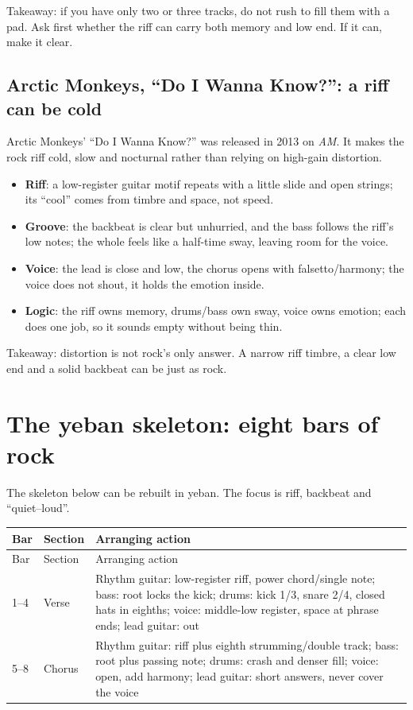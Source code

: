 Takeaway: if you have only two or three tracks, do not rush to fill them with a pad. Ask first whether the riff can carry both memory and low end. If it can, make it clear.

\subsection{Arctic Monkeys, ``Do I Wanna Know?'': a riff can be cold}
\label{sec:rock-case-do-i-wanna-know}

Arctic Monkeys' ``Do I Wanna Know?'' was released in 2013 on \emph{AM}. It makes the rock riff cold, slow and nocturnal rather than relying on high-gain distortion.

\begin{itemize}
\item \textbf{Riff}: a low-register guitar motif repeats with a little slide and open strings; its ``cool'' comes from timbre and space, not speed.
\item \textbf{Groove}: the backbeat is clear but unhurried, and the bass follows the riff's low notes; the whole feels like a half-time sway, leaving room for the voice.
\item \textbf{Voice}: the lead is close and low, the chorus opens with falsetto/harmony; the voice does not shout, it holds the emotion inside.
\item \textbf{Logic}: the riff owns memory, drums/bass own sway, voice owns emotion; each does one job, so it sounds empty without being thin.
\end{itemize}

Takeaway: distortion is not rock's only answer. A narrow riff timbre, a clear low end and a solid backbeat can be just as rock.

\section{The yeban skeleton: eight bars of rock}
\label{sec:rock-yeban}

The skeleton below can be rebuilt in yeban. The focus is riff, backbeat and ``quiet--loud''.

\begin{longtable}{p{}p{}p{}}
\toprule
Bar & Section & Arranging action \\
\midrule
\endfirsthead
\toprule
Bar & Section & Arranging action \\
\midrule
\endhead
1--4 & Verse & Rhythm guitar: low-register riff, power chord/single note; bass: root locks the kick; drums: kick 1/3, snare 2/4, closed hats in eighths; voice: middle-low register, space at phrase ends; lead guitar: out \\
5--8 & Chorus & Rhythm guitar: riff plus eighth strumming/double track; bass: root plus passing note; drums: crash and denser fill; voice: open, add harmony; lead guitar: short answers, never cover the voice \\
\bottomrule
\end{longtable}

